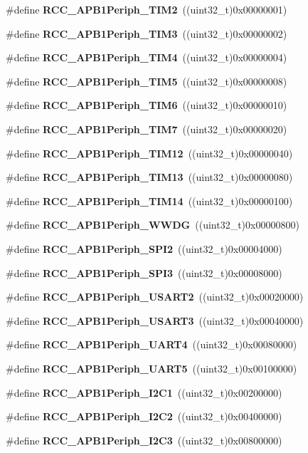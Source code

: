 \begin{DoxyCompactItemize}
\#define \textbf{ R\+C\+C\+\_\+\+A\+P\+B1\+Periph\+\_\+\+T\+I\+M2}~((uint32\+\_\+t)0x00000001)
\item 
\#define \textbf{ R\+C\+C\+\_\+\+A\+P\+B1\+Periph\+\_\+\+T\+I\+M3}~((uint32\+\_\+t)0x00000002)
\item 
\#define \textbf{ R\+C\+C\+\_\+\+A\+P\+B1\+Periph\+\_\+\+T\+I\+M4}~((uint32\+\_\+t)0x00000004)
\item 
\#define \textbf{ R\+C\+C\+\_\+\+A\+P\+B1\+Periph\+\_\+\+T\+I\+M5}~((uint32\+\_\+t)0x00000008)
\item 
\#define \textbf{ R\+C\+C\+\_\+\+A\+P\+B1\+Periph\+\_\+\+T\+I\+M6}~((uint32\+\_\+t)0x00000010)
\item 
\#define \textbf{ R\+C\+C\+\_\+\+A\+P\+B1\+Periph\+\_\+\+T\+I\+M7}~((uint32\+\_\+t)0x00000020)
\item 
\#define \textbf{ R\+C\+C\+\_\+\+A\+P\+B1\+Periph\+\_\+\+T\+I\+M12}~((uint32\+\_\+t)0x00000040)
\item 
\#define \textbf{ R\+C\+C\+\_\+\+A\+P\+B1\+Periph\+\_\+\+T\+I\+M13}~((uint32\+\_\+t)0x00000080)
\item 
\#define \textbf{ R\+C\+C\+\_\+\+A\+P\+B1\+Periph\+\_\+\+T\+I\+M14}~((uint32\+\_\+t)0x00000100)
\item 
\#define \textbf{ R\+C\+C\+\_\+\+A\+P\+B1\+Periph\+\_\+\+W\+W\+DG}~((uint32\+\_\+t)0x00000800)
\item 
\#define \textbf{ R\+C\+C\+\_\+\+A\+P\+B1\+Periph\+\_\+\+S\+P\+I2}~((uint32\+\_\+t)0x00004000)
\item 
\#define \textbf{ R\+C\+C\+\_\+\+A\+P\+B1\+Periph\+\_\+\+S\+P\+I3}~((uint32\+\_\+t)0x00008000)
\item 
\#define \textbf{ R\+C\+C\+\_\+\+A\+P\+B1\+Periph\+\_\+\+U\+S\+A\+R\+T2}~((uint32\+\_\+t)0x00020000)
\item 
\#define \textbf{ R\+C\+C\+\_\+\+A\+P\+B1\+Periph\+\_\+\+U\+S\+A\+R\+T3}~((uint32\+\_\+t)0x00040000)
\item 
\#define \textbf{ R\+C\+C\+\_\+\+A\+P\+B1\+Periph\+\_\+\+U\+A\+R\+T4}~((uint32\+\_\+t)0x00080000)
\item 
\#define \textbf{ R\+C\+C\+\_\+\+A\+P\+B1\+Periph\+\_\+\+U\+A\+R\+T5}~((uint32\+\_\+t)0x00100000)
\item 
\#define \textbf{ R\+C\+C\+\_\+\+A\+P\+B1\+Periph\+\_\+\+I2\+C1}~((uint32\+\_\+t)0x00200000)
\item 
\#define \textbf{ R\+C\+C\+\_\+\+A\+P\+B1\+Periph\+\_\+\+I2\+C2}~((uint32\+\_\+t)0x00400000)
\item 
\#define \textbf{ R\+C\+C\+\_\+\+A\+P\+B1\+Periph\+\_\+\+I2\+C3}~((uint32\+\_\+t)0x00800000)

\end{DoxyCompactItemize}
